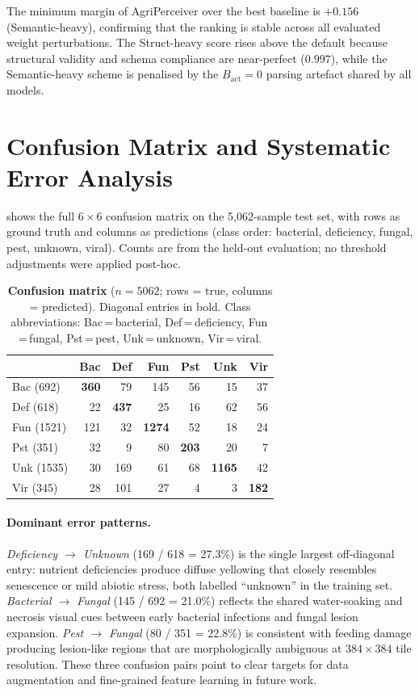 \documentclass{article}
\newcommand{\ours}{AgriPerceiver}
\begin{document}
The minimum margin of \ours{} over the best baseline is $+0.156$
(Semantic-heavy), confirming that the ranking is stable across all
evaluated weight perturbations.
The Struct-heavy score rises above the default because structural
validity and schema compliance are near-perfect ($0.997$), while the
Semantic-heavy scheme is penalised by the $B_{\text{act}}{=}0$ parsing
artefact shared by all models.

\section{Confusion Matrix and Systematic Error Analysis}
\label{app:confusion}

 shows the full $6 \times 6$ confusion matrix on the
5,062-sample test set, with rows as ground truth and columns as
predictions (class order: bacterial, deficiency, fungal, pest, unknown,
viral).
Counts are from the held-out evaluation; no threshold adjustments were
applied post-hoc.

\begin{table}[h]
\centering
\caption{\textbf{Confusion matrix} ($n{=}5062$; rows = true, columns =
  predicted). Diagonal entries in bold. Class abbreviations:
  Bac\,=\,bacterial, Def\,=\,deficiency, Fun\,=\,fungal,
  Pst\,=\,pest, Unk\,=\,unknown, Vir\,=\,viral.}
\label{tab:confusion}
\small
\setlength{\tabcolsep}{4pt}
\begin{tabular}{@{}lrrrrrr@{}}
\toprule
            & Bac & Def & Fun & Pst & Unk & Vir \\
\midrule
Bac (692)  & \textbf{360} & 79  & 145 & 56 & 15  & 37 \\
Def (618)  & 22  & \textbf{437} & 25  & 16 & 62  & 56 \\
Fun (1521) & 121 & 32  & \textbf{1274}& 52 & 18  & 24 \\
Pst (351)  & 32  & 9   & 80  & \textbf{203}& 20 & 7 \\
Unk (1535) & 30  & 169 & 61  & 68 & \textbf{1165}& 42 \\
Vir (345)  & 28  & 101 & 27  & 4  & 3   & \textbf{182}\\
\bottomrule
\end{tabular}
\end{table}

\paragraph{Dominant error patterns.}
\emph{Deficiency $\to$ Unknown} (169 / 618 = 27.3\%) is the single
largest off-diagonal entry: nutrient deficiencies produce diffuse
yellowing that closely resembles senescence or mild abiotic stress,
both labelled ``unknown'' in the training set.
\emph{Bacterial $\to$ Fungal} (145 / 692 = 21.0\%) reflects the
shared water-soaking and necrosis visual cues between early bacterial
infections and fungal lesion expansion.
\emph{Pest $\to$ Fungal} (80 / 351 = 22.8\%) is consistent with
feeding damage producing lesion-like regions that are
morphologically ambiguous at $384 \times 384$ tile resolution.
These three confusion pairs point to clear targets for data augmentation
and fine-grained feature learning in future work.
\end{document}
